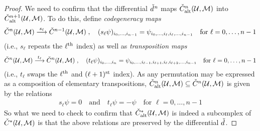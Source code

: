 \documentclass[a4paper,parskip=half,numbers=enddot, DIV=12]{scrreprt}
\begin{document}
	\begin{proof}
		We need to confirm that the differential $\check{d}\hspace{0.06125em}^n$ maps $\check{C}_{\mathrm{alt}}^n(\mathcal{U},\mathcal{M})$ into $\check{C}_{\mathrm{alt}}^{n+1}(\mathcal{U},\mathcal{M})$. To do this, define \emph{codegeneracy maps} 
		\begin{align*}
			\check{C}^n(\Uu,\Mm)\morphism[s_\ell]\check{C}^{n-1}(\Uu,\Mm)\;,\quad (s_\ell\psi)_{i_0,\ldots,i_{n-1}}=\psi_{i_0,\ldots,i_\ell,i_\ell,\ldots,i_{n-1}}\quad\text{for }\ell=0,\ldots,n-1
		\end{align*}
		(i.e., $s_\ell$ repeats the $\ell^{\text{th}}$ index) as well as \emph{transposition maps}
		\begin{align*}
			\check{C}^n(\Uu,\Mm)\morphism[t_\ell]\check{C}^n(\Uu,\Mm)\;,\quad (t_\ell\psi)_{i_0,\ldots,i_n}=\psi_{i_0,\ldots,i_{\ell-1},i_{\ell+1},i_\ell,i_{\ell+2},\ldots,i_{n-1}}\quad\text{for }\ell=0,\ldots,n-1
		\end{align*}
		(i.e., $t_\ell$ swaps the $\ell^{\text{th}}$ and $(\ell+1)^{\text{st}}$ index). As any permutation may be expressed as a composition of elementary transpositions, $\check{C}_{\mathrm{alt}}^n(\mathcal{U},\mathcal{M})\subseteq\check{C}^n(\mathcal{U},\mathcal{M})$ is given by the relations
		\begin{align*}
			s_\ell\psi=0\quad\text{and}\quad t_\ell\psi=-\psi\quad\text{for }\ell=0,\ldots,n-1
		\end{align*}
		So what we need to check to confirm that $\check{C}_{\mathrm{alt}}^*(\mathcal{U},\mathcal{M})$ is indeed a subcomplex of $\check{C}^*(\mathcal{U},\mathcal{M})$ is that the above relations are preserved by the differential $\check{d}\hspace{0.06125em}$.
		

\end{proof}
\end{document}
